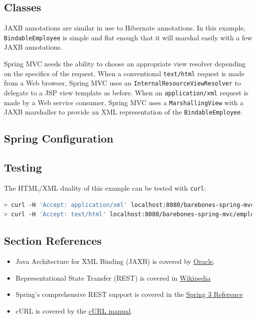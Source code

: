 \documentclass{article}
\begin{document}
\subsection{Classes}

JAXB annotations are similar in use to Hibernate annotations.  In this example, \texttt{BindableEmployee} is simple and flat enough that it will marshal easily with a few JAXB annotations.



Spring MVC needs the ability to choose an appropriate view resolver depending on the specifics of the request.  When a conventional \texttt{text/html} request is made from a Web browser, Spring MVC uses an \texttt{InternalResourceViewResolver} to delegate to a JSP view template as before.  When an \texttt{application/xml} request is made by a Web service consumer, Spring MVC uses a \texttt{MarshallingView} with a JAXB marshaller to provide an XML representation of the \texttt{BindableEmployee}.

\subsection{Spring Configuration}



\subsection{Testing}

The HTML/XML duality of this example can be tested with \texttt{curl}:

\begin{lstlisting}[language=bash]
> curl -H 'Accept: application/xml' localhost:8080/barebones-spring-mvc/employee
> curl -H 'Accept: text/html' localhost:8080/barebones-spring-mvc/employee
\end{lstlisting}

\subsection{Section References}

\begin{itemize}
\item Java Architecture for XML Binding (JAXB) is covered by \href{http://www.oracle.com/technetwork/articles/javase/index-140168.html}{Oracle}.
\item Representational State Transfer (REST) is covered in \href{http://en.wikipedia.org/wiki/Representational_State_Transfer}{Wikipedia}
\item Spring's comprehensive REST support is covered in the \href{http://static.springsource.org/spring/docs/3.0.x/spring-framework-reference/html/new-in-3.html#d0e1188}{Spring 3 Reference}
\item cURL is covered by the \href{http://curl.haxx.se/docs/manual.html}{cURL manual}.
\end{itemize}
\end{document}

